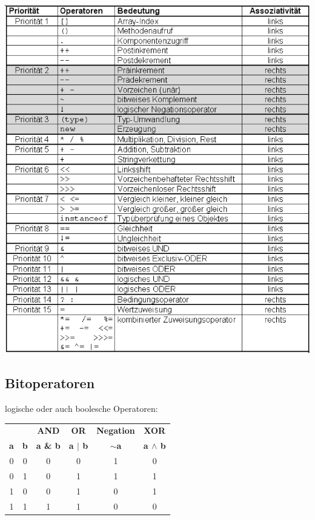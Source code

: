 \documentclass[a4paper,10pt]{article}
\newcommand{\Bold}[1]{\textbf{#1}} %
\begin{document}
\includegraphics[width=150mm]{operatoren_prios.png}

\subsection{Bitoperatoren}
logische oder auch boolesche Operatoren: \\
\begin{tabular}{|c|c|c|c|c|c|}
	\hline
	& & \Bold {AND} & \Bold {OR} & \Bold {Negation} & \Bold {XOR} \\
	\Bold {a} & \Bold {b} & \Bold {a \& b} & \Bold {a $|$ b} & \Bold {$\sim$a} & \Bold {a $\wedge$  b} \\
	\hline
	0 & 0 & 0 & 0 & 1 & 0 \\
	0 & 1 & 0 & 1 & 1 & 1 \\
	1 & 0 & 0 & 1 & 0 & 1 \\
	1 & 1 & 1 & 1 & 0 & 0 \\
	\hline
\end{tabular}
\end{document}
